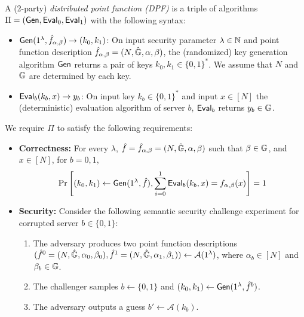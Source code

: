 \begin{definition}\label{def:dpf}
A 
(2-party)
\emph{distributed point function (DPF)}
is a triple of algorithms %
$\Pi=({\sf Gen},{\sf Eval}_0,{\sf Eval}_1)$
with the following syntax: 
\begin{itemize}
    \item ${\sf Gen}(1^\lambda,\hat{f}_{\alpha,\beta})\rightarrow (k_0,k_1)$: On input security parameter $\lambda\in\mathbb{N}$ and point function description $\hat{f}_{\alpha,\beta}=(N,\hat{\mathbb{G}},\alpha,\beta)$, the (randomized) key generation algorithm ${\sf Gen}$ returns a pair of keys $k_0,k_1\in\{0,1\}^*$.  
    We assume that $N$ and $\mathbb{G}$ are determined by each key.
    \item ${\sf Eval}_b(k_b,x)\rightarrow y_b$: On input key $k_b\in\{0,1\}^*$ and input $x\in[N]$ the (deterministic) evaluation algorithm of server $b$, ${\sf Eval}_b$ returns 
    $y_b\in\mathbb{G}$.
\end{itemize}
We require $\Pi$ to satisfy the following requirements:
\begin{itemize}
    \item \textbf{Correctness:} For every $\lambda$, $\hat{f}=\hat{f}_{\alpha,\beta}=(N,\hat{\mathbb{G}},\alpha,\beta)$ such that $\beta\in\mathbb{G}$, and $x\in[N]$, for $b=0,1$,  
    $$\Pr\left[(k_0,k_1)\leftarrow{\sf Gen}(1^\lambda,\hat{f}), \sum_{i=0}^{1}{\sf Eval}_b(k_b,x)=f_{\alpha,\beta}(x)\right]=1$$
    \item \textbf{Security:} Consider the following semantic security challenge experiment for corrupted server $b\in\{0,1\}$:
    \begin{enumerate}
        \item The adversary produces two point function descriptions $(\hat{f}^0=(N,\hat{\mathbb{G}},\alpha_0,\beta_0),\hat{f}^1=(N,\hat{\mathbb{G}},\alpha_1,\beta_1))\leftarrow\mathcal{A}(1^\lambda)$, where $\alpha_b\in[N]$ and $\beta_b\in\mathbb{G}$.
        \item The challenger samples $b\gets\{0,1\}$ and $(k_0,k_1)\leftarrow{\sf Gen}(1^\lambda,\hat{f}^b)$.
        \item The adversary outputs a guess $b'\leftarrow\mathcal{A}(k_b)$.

\end{enumerate}
\end{itemize}
\end{definition}
